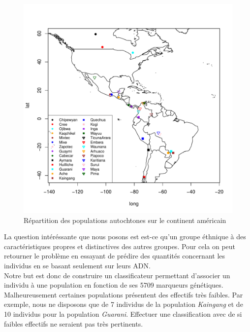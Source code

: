 \documentclass[12pt,a4paper]{article}
\begin{document}
\begin{figure}[h!]
	\begin{center}
		\includegraphics[scale=0.8]{figures/map.pdf}
		\caption{Répartition des populations autochtones sur le continent américain}
		\label{fig:map}
	\end{center}
\end{figure}
La question intéréssante que nous posons est est-ce qu'un groupe éthnique à des
caractéristiques propres et distinctives des autres groupes. Pour cela on peut
retourner le problème en essayant de prédire des quantités concernant les individus
en se basant seulement sur leurs ADN. \\
Notre but est donc de construire un classificateur permettant d'associer un individu
à une population en fonction de ses 5709 marqueurs génétiques. Malheureusement
certaines populations présentent des effectifs très faibles. Par exemple, nous
ne disposons que de 7 individus de la population \textit{Kaingang} et de 10
individus pour la population \textit{Guarani}. Effectuer une classification
avec de si faibles effectifs ne seraient pas très pertinents.\vspace{2mm}
\end{document}
